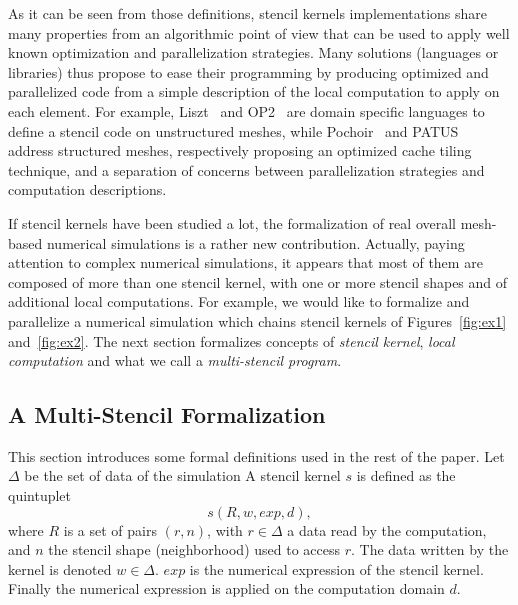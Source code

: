 As it can be seen from those definitions, stencil kernels implementations share many properties from an algorithmic point of view that can be used to apply well known optimization and parallelization strategies.
Many solutions (languages or libraries) thus propose to ease their programming by producing optimized and parallelized code from a simple description of the local computation to apply on each element.
For example, Liszt~\cite{DeVito2011LDS} and OP2~\cite{Giles2011} are domain specific languages to define a stencil code on unstructured meshes, while Pochoir~\cite{spaaTangCKLL11} and PATUS~\cite{citeulike12258902} address structured meshes, respectively proposing an optimized cache tiling technique, and a separation of concerns between parallelization strategies and computation descriptions.

If stencil kernels have been studied a lot, the formalization of real overall mesh-based numerical simulations is a rather new contribution. Actually, paying attention to complex numerical simulations, it appears that most of them are composed of more than one stencil kernel, with one or more stencil shapes and of additional local computations. For example, we would like to formalize and parallelize a numerical simulation which chains stencil kernels of Figures~\ref{fig:ex1} and~\ref{fig:ex2}. The next section formalizes concepts of \emph{stencil kernel}, \emph{local computation} and what we call a \emph{multi-stencil program}.

\subsection{A Multi-Stencil Formalization}
\label{sect:multistencil}
This section introduces some formal definitions used in the rest of the paper.
Let $\Delta$ be the set of data of the simulation
A stencil kernel $s$ is defined as the quintuplet
\begin{equation} 
s(R,w,exp,d),
\label{eq:st}
\end{equation}
where $R$ is a set of pairs $(r,n)$, with $r \in \Delta$ a data read by the computation, and $n$ the stencil shape (neighborhood) used to access $r$. The data written by the kernel is denoted $w \in \Delta$. $exp$ is the numerical expression of the stencil kernel. Finally the numerical expression is applied on the computation domain $d$.

